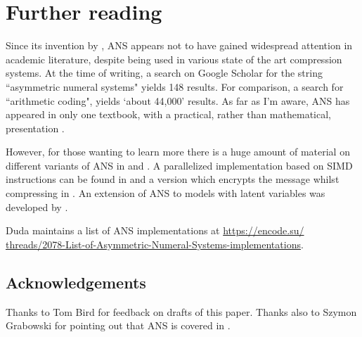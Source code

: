\documentclass{article}
\theoremstyle{definition}
\begin{document}
\section{Further reading}
Since its invention by \citet{duda2009}, ANS appears not to have gained
widespread attention in academic literature, despite being used in various
state of the art compression systems. At the time of writing, a search on
Google Scholar for the string ``asymmetric numeral systems" yields 148 results.
For comparison, a search for ``arithmetic coding", yields `about 44,000'
results. As far as I'm aware, ANS has appeared in only one textbook, with a
practical, rather than mathematical, presentation \citep{mcanlis2016}.

However, for those wanting to learn more there is a huge amount of material on
different variants of ANS in \citet{duda2009} and \citet{duda2015}. A
parallelized implementation based on SIMD instructions can be found in
\citet{giesen2014} and a version which encrypts the message whilst compressing
in \citet{duda2016}.  An extension of ANS to models with latent variables was
developed by \citet{townsend2019}.

Duda maintains a list of ANS implementations at
\url{
  https://encode.su/
  threads/2078-List-of-Asymmetric-Numeral-Systems-implementations}.

\subsection*{Acknowledgements}
  Thanks to Tom Bird for feedback on drafts of this paper. Thanks also to
  Szymon Grabowski for pointing out that ANS is covered in \citet{mcanlis2016}.

\printbibliography
\end{document}
